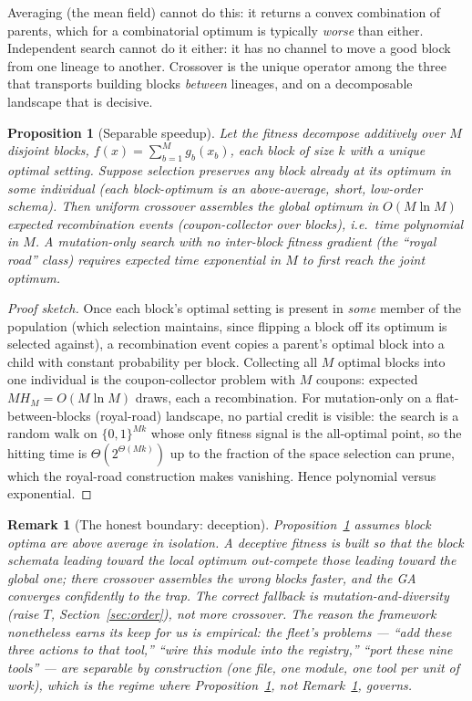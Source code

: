 \documentclass[11pt]{article}
\newtheorem{proposition}{Proposition}
\newtheorem{remark}{Remark}
\begin{document}
Averaging (the mean field) cannot do this: it returns a convex combination of parents, which for a
combinatorial optimum is typically \emph{worse} than either. Independent search cannot do it either: it has
no channel to move a good block from one lineage to another. Crossover is the unique operator among the three
that transports building blocks \emph{between} lineages, and on a decomposable landscape that is decisive.

\begin{proposition}[Separable speedup]
\label{prop:speedup}
Let the fitness decompose additively over $M$ disjoint blocks, $f(x)=\sum_{b=1}^{M} g_b(x_b)$, each block of
size $k$ with a unique optimal setting. Suppose selection preserves any block already at its optimum in some
individual (each block-optimum is an above-average, short, low-order schema). Then uniform crossover assembles
the global optimum in $O(M\ln M)$ expected recombination events (coupon-collector over blocks), i.e.\ time
polynomial in $M$. A mutation-only search with no inter-block fitness gradient (the ``royal road'' class)
requires expected time exponential in $M$ to first reach the joint optimum.
\end{proposition}

\begin{proof}[Proof sketch]
Once each block's optimal setting is present in \emph{some} member of the population (which selection
maintains, since flipping a block off its optimum is selected against), a recombination event copies a parent's
optimal block into a child with constant probability per block. Collecting all $M$ optimal blocks into one
individual is the coupon-collector problem with $M$ coupons: expected $M H_M = O(M\ln M)$ draws, each a
recombination. For mutation-only on a flat-between-blocks (royal-road) landscape, no partial credit is
visible: the search is a random walk on $\{0,1\}^{Mk}$ whose only fitness signal is the all-optimal point, so
the hitting time is $\Theta(2^{\Theta(Mk)})$ up to the fraction of the space selection can prune, which the
royal-road construction makes vanishing. Hence polynomial versus exponential.
\end{proof}

\begin{remark}[The honest boundary: deception]
\label{rem:deception}
Proposition~\ref{prop:speedup} assumes block optima are \emph{above average in isolation}. A \emph{deceptive}
fitness \cite{goldberg1989} is built so that the block schemata leading toward the local optimum out-compete those
leading toward the global one; there crossover assembles the wrong blocks faster, and the GA converges
confidently to the trap. The correct fallback is mutation-and-diversity (raise $T$, Section~\ref{sec:order}),
not more crossover. The reason the framework nonetheless earns its keep for us is empirical: the fleet's
problems --- ``add these three actions to that tool,'' ``wire this module into the registry,'' ``port these
nine tools'' --- are \emph{separable by construction} (one file, one module, one tool per unit of work), which
is the regime where Proposition~\ref{prop:speedup}, not Remark~\ref{rem:deception}, governs.
\end{remark}
\end{document}
